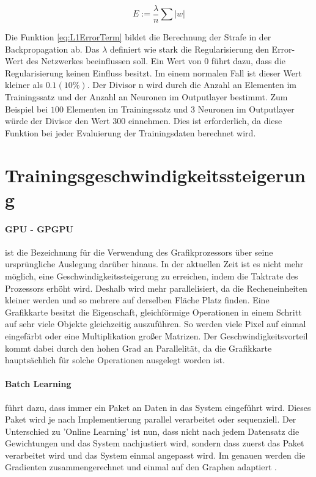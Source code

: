 \begin{equation}
	E := \frac{\lambda}{n} \sum |w|
	\label{eq:L1ErrorTerm}
\end{equation}

Die Funktion \ref{eq:L1ErrorTerm} bildet die Berechnung der Strafe in der Backpropagation ab.
Das $\lambda$ definiert wie stark die Regularisierung den Error-Wert des Netzwerkes beeinflussen soll.
Ein Wert von $0$ führt dazu, dass die Regularisierung keinen Einfluss besitzt. 
Im einem normalen Fall ist dieser Wert kleiner als $0.1 (10\%)$.
Der Divisor n wird durch die Anzahl an Elementen im Trainingssatz und der Anzahl an Neuronen im Outputlayer bestimmt.
Zum Beispiel bei $100$ Elementen im Trainingssatz und $3$ Neuronen im Outputlayer würde der Divisor den Wert $300$ einnehmen.
Dies ist erforderlich, da diese Funktion bei jeder Evaluierung der Trainingsdaten berechnet wird.

\section{Trainingsgeschwindigkeitssteigerung}

\paragraph{GPU - GPGPU} ist die Bezeichnung für die Verwendung des Grafikprozessors über seine ursprüngliche Auslegung darüber hinaus.
In der aktuellen Zeit ist es nicht mehr möglich, eine Geschwindigkeitssteigerung zu erreichen, indem die Taktrate des Prozessors erhöht wird. 
Deshalb wird mehr parallelisiert, da die Recheneinheiten kleiner werden und so mehrere auf derselben Fläche Platz finden. 
Eine Grafikkarte besitzt die Eigenschaft, gleichförmige Operationen in einem Schritt auf sehr viele Objekte gleichzeitig auszuführen. 
So werden viele Pixel auf einmal eingefärbt oder eine Multiplikation großer Matrizen. 
Der Geschwindigkeitsvorteil kommt dabei durch den hohen Grad an Parallelität, da die Grafikkarte hauptsächlich für solche Operationen ausgelegt worden ist.

\paragraph{Batch Learning} %
führt dazu, dass immer ein Paket an Daten in das System eingeführt wird. 
Dieses Paket wird je nach Implementierung parallel verarbeitet oder sequenziell. 
Der Unterschied zu 'Online Learning' ist nun, dass nicht nach jedem Datensatz die Gewichtungen und das System nachjustiert wird, sondern dass zuerst das Paket verarbeitet wird und das System einmal angepasst wird. 
Im genauen werden die Gradienten zusammengerechnet und einmal auf den Graphen adaptiert \cite{AI3}.






